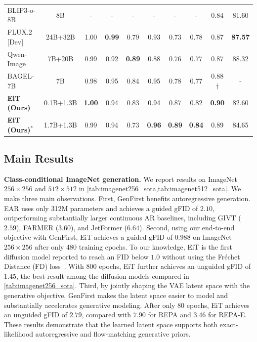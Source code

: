 \documentclass[]{bytedance_seed}
\begin{document}
\begin{table}[t]
\begin{tabular}{lccccccccc}
BLIP3-o-8B\cite{chen2025blip3} & 8B & - & - & - & - & - & - & 0.84 & 81.60 \\
FLUX.2 [Dev]~\cite{flux-2-2025}    & 24B+32B & 1.00 & \textbf{0.99} & 0.79 & 0.93 & 0.73 & 0.78 & 0.87 & \textbf{87.57}\\
Qwen-Image~\cite{qwenimage} &  7B+20B   & 0.99  & 0.92  & \textbf{0.89}  & 0.88  & 0.76  & 0.77  &  0.87 & 88.32 \\ 
BAGEL-7B\cite{bagel} & 7B & 0.98 & 0.95 & 0.84 & 0.95 & 0.78 & 0.77 & 0.88$\dagger$ & -\\
\midrule
\rowcolor{blue!8} \textbf{EiT (Ours)}  & 0.1B+1.3B & \textbf{1.00} & 0.94 & 0.83 & 0.94 & 0.87 & 0.82 & \textbf{0.90} & 82.60
    \\
\rowcolor{blue!8} \textbf{EiT (Ours)$^{*}$}  & 1.7B+1.3B & 0.99 & 0.94 & 0.73 & \textbf{0.96} & \textbf{0.89} & \textbf{0.84} & 0.89 & 84.65
    \\
\bottomrule
\end{tabular}
\label{tab:GenEval}
\end{table}

\subsection{Main Results}
\label{subsec:main_results}

\textbf{Class-conditional ImageNet generation.}
We report results on ImageNet $256\times256$ and $512\times512$ in
\cref{tab:imagenet256_sota,tab:imagenet512_sota}. We make three main
observations.
First, GenFirst benefits autoregressive generation. EAR uses only 312M parameters and achieves a guided gFID of $2.10$, outperforming substantially larger continuous AR baselines, including GIVT ($2.59$), FARMER ($3.60$), and JetFormer ($6.64$). 
Second, using our end-to-end objective with GenFirst, EiT achieves a guided gFID of $\mathbf{0.988}$ on ImageNet $256\times256$ after only 480 training epochs. 
To our knowledge, EiT is the first diffusion model reported to reach an FID below $1.0$ without using the Fréchet Distance (FD) loss~\cite{fd_loss}.
With 800 epochs, EiT further achieves an unguided gFID of $\mathbf{1.45}$, the
best result among the diffusion models compared in
\cref{tab:imagenet256_sota}.
Third, by jointly shaping the VAE latent space with the generative objective, GenFirst makes the latent space easier to model and substantially accelerates generative modeling. 
After only 80 epochs, EiT achieves an unguided gFID of $2.79$, compared with $7.90$ for REPA and $3.46$ for REPA-E. 
These results demonstrate that the learned latent space supports both exact-likelihood autoregressive and flow-matching generative priors.
\end{document}
